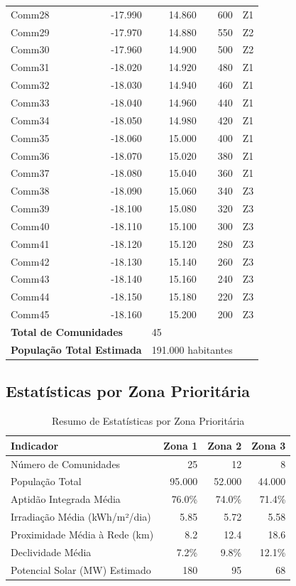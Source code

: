 \documentclass[12pt, a4paper]{article}
\begin{document}
\begin{itemize}
\begin{table}[H]
\begin{tabular}{|l|r|r|r|r|}
Comm28 & -17.990 & 14.860 & 600 & Z1 \\
Comm29 & -17.970 & 14.880 & 550 & Z2 \\
Comm30 & -17.960 & 14.900 & 500 & Z2 \\
Comm31 & -18.020 & 14.920 & 480 & Z1 \\
Comm32 & -18.030 & 14.940 & 460 & Z1 \\
Comm33 & -18.040 & 14.960 & 440 & Z1 \\
Comm34 & -18.050 & 14.980 & 420 & Z1 \\
Comm35 & -18.060 & 15.000 & 400 & Z1 \\
Comm36 & -18.070 & 15.020 & 380 & Z1 \\
Comm37 & -18.080 & 15.040 & 360 & Z1 \\
Comm38 & -18.090 & 15.060 & 340 & Z3 \\
Comm39 & -18.100 & 15.080 & 320 & Z3 \\
Comm40 & -18.110 & 15.100 & 300 & Z3 \\
Comm41 & -18.120 & 15.120 & 280 & Z3 \\
Comm42 & -18.130 & 15.140 & 260 & Z3 \\
Comm43 & -18.140 & 15.160 & 240 & Z3 \\
Comm44 & -18.150 & 15.180 & 220 & Z3 \\
Comm45 & -18.160 & 15.200 & 200 & Z3 \\
\hline
\multicolumn{2}{|l|}{\textbf{Total de Comunidades}} & \multicolumn{2}{l|}{45} & \\
\multicolumn{2}{|l|}{\textbf{População Total Estimada}} & \multicolumn{2}{l|}{191.000 habitantes} & \\
\hline
\end{tabular}
\end{table}

\subsection{Estatísticas por Zona Prioritária}

\begin{table}[H]
\centering
\caption{Resumo de Estatísticas por Zona Prioritária}
\label{tab:zone_stats}
\begin{tabular}{|l|r|r|r|}
\hline
\textbf{Indicador} & \textbf{Zona 1} & \textbf{Zona 2} & \textbf{Zona 3} \\
\hline
Número de Comunidades & 25 & 12 & 8 \\
População Total & 95.000 & 52.000 & 44.000 \\
Aptidão Integrada Média & 76.0\% & 74.0\% & 71.4\% \\
Irradiação Média (kWh/m²/dia) & 5.85 & 5.72 & 5.58 \\
Proximidade Média à Rede (km) & 8.2 & 12.4 & 18.6 \\
Declividade Média & 7.2\% & 9.8\% & 12.1\% \\
Potencial Solar (MW) Estimado & 180 & 95 & 68 \\
\hline
\end{tabular}
\end{table}


\end{itemize}
\end{document}

